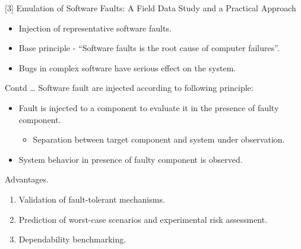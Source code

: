 \documentclass[xcolor=x11names,compress]{beamer}
\renewcommand{\(}{\begin{columns}}
\renewcommand{\)}{\end{columns}}
\newcommand{\<}[1]{\begin{column}{#1}}
\renewcommand{\>}{\end{column}}
\begin{document}
\begin{frame}{ [3] Emulation of Software Faults: A Field Data Study and	a Practical Approach}
	\begin{itemize}
		\item Injection of representative software faults.
		\newline
		\item Base principle - ``Software faults is the root cause of computer failures''.
		\newline
		\item Bugs in complex software have serious effect on the system.
		
	\end{itemize}
\end{frame}
\begin{frame}{Contd \dots}
	Software
	fault are injected according to following principle:
	
	\begin{itemize}
		\item Fault is injected to a component to evaluate it in the presence of faulty component.
		
		\begin{itemize}
			\item Separation between target component and system under observation.
			
		\end{itemize}
		\item System behavior in presence of faulty component is observed.\newline
	\end{itemize}
	
	\begin{block}{Advantages.}
	\begin{enumerate}
		\item Validation of fault-tolerant mechanisms.
		\item  Prediction of worst-case scenarios and experimental risk assessment.
		\item  Dependability benchmarking.
	\end{enumerate}
	\end{block}
\end{frame}
\end{document}
